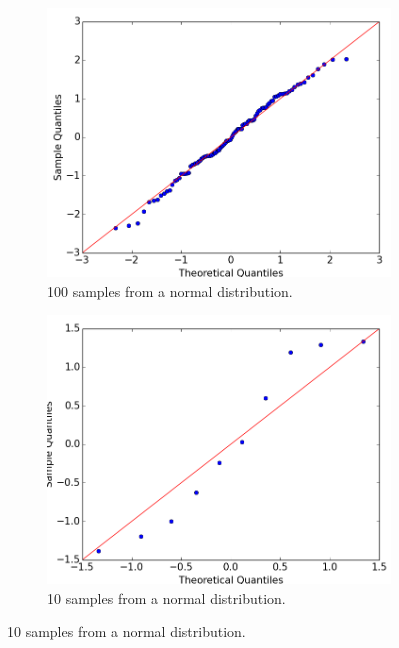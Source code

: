\begin{figure}
\begin{subfigure}{0.38\textwidth}
\includegraphics[width=\linewidth]{figs/normality/100samples_random2.png}
\caption{100 samples from a normal distribution.} \label{fig:normality_random100}
\end{subfigure}
\hspace*{\fill} %
\begin{subfigure}{0.38\textwidth}
\includegraphics[width=\linewidth]{figs/normality/10samples_random2.png}
\caption{10 samples from a normal distribution.} \label{fig:normality_random}
\end{subfigure}


\end{figure}
